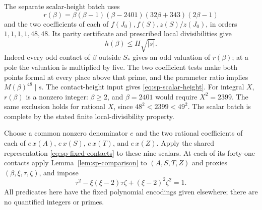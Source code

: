 The separate scalar-height batch uses
\[
 r(\beta)=\beta(\beta-1)(\beta-2401)(32\beta+343)(2\beta-1)
\]
and the two coefficients of each of $f(J_0),f(S),z(S)/z(J_0)$,
in orders $1,1,1,1,48,48$. Its parity certificate and prescribed local
divisibilities give
\begin{equation}\label{eq:sp-scalar-height}
 h(\beta)\le H\sqrt{|s|}.
\end{equation}
Indeed every odd contact of $\beta$ outside $S_*$ gives an odd
valuation of $r(\beta)$; at a pole the valuation is multiplied by
five. The two coefficient tests make both points formal at every place
above that prime, and the parameter ratio implies $M(\beta)^{48}\mid s$.
The contact-height input gives \eqref{eq:sp-scalar-height}.
For integral $X$, $r(\beta)$ is a nonzero integer: $\beta\ge2$,
and $\beta=2401$ would require $X^2=2399$. The same exclusion holds
for rational $X$, since $48^2<2399<49^2$. The scalar batch is complete
by the stated finite local-divisibility property.

Choose a common nonzero denominator $e$ and the two rational coefficients
of each of $e\,x(A)$, $e\,x(S)$, $e\,x(T)$, and $e\,x(Z)$.
Apply the shared representation
\eqref{eq:sp-fixed-contacts} to these nine scalars. At each of its
forty-one contacts apply Lemma~\ref{lem:sp-comparison} to
$(A,S,T,Z)$ and proxies $(\beta,\xi,\tau,\zeta)$, and impose
\begin{equation}\label{eq:sp-proxy-lucas}
 \tau^2-\xi(\xi-2)\tau\zeta+(\xi-2)^2\zeta^2=1.
\end{equation}
All predicates here have the fixed polynomial encodings given elsewhere;
there are no quantified integers or primes.

